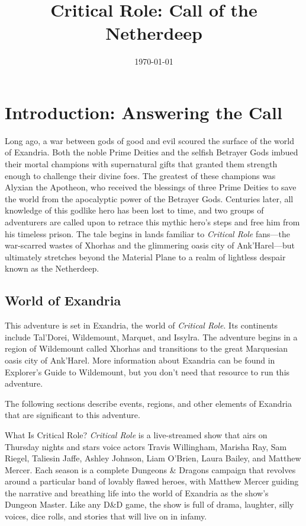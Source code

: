 \documentclass[a4paper, 11pt, bg=full, twocolumn, nooutline]{dndbook}
\title{Critical Role: Call of the Netherdeep}
\date{\today}
\begin{document}
\frontmatter

\maketitle
\thispagestyle{empty}
\clearpage

\tableofcontents
\clearpage

\mainmatter

\chapter{Introduction: Answering the Call}\label{ch:introduction-answering-the-call-1-1}

Long ago, a war between gods of good and evil scoured the surface of the world of Exandria. Both the noble Prime Deities and the selfish Betrayer Gods imbued their mortal champions with supernatural gifts that granted them strength enough to challenge their divine foes. The greatest of these champions was Alyxian the Apotheon, who received the blessings of three Prime Deities to save the world from the apocalyptic power of the Betrayer Gods.
Centuries later, all knowledge of this godlike hero has been lost to time, and two groups of adventurers are called upon to retrace this mythic hero's steps and free him from his timeless prison. The tale begins in lands familiar to \textit{Critical Role} fans---the war-scarred wastes of Xhorhas and the glimmering oasis city of Ank'Harel---but ultimately stretches beyond the Material Plane to a realm of lightless despair known as the Netherdeep.
\section{World of Exandria}

This adventure is set in Exandria, the world of \textit{Critical Role}. Its continents include Tal'Dorei, Wildemount, Marquet, and Issylra. The adventure begins in a region of Wildemount called Xhorhas and transitions to the great Marquesian oasis city of Ank'Harel. More information about Exandria can be found in Explorer's Guide to Wildemount, but you don't need that resource to run this adventure.

The following sections describe events, regions, and other elements of Exandria that are significant to this adventure.

\begin{DndSidebar}{What Is Critical Role?}
\textit{Critical Role} is a live-streamed show that airs on Thursday nights and stars voice actors Travis Willingham, Marisha Ray, Sam Riegel, Taliesin Jaffe, Ashley Johnson, Liam O'Brien, Laura Bailey, and Matthew Mercer. Each season is a complete Dungeons \& Dragons campaign that revolves around a particular band of lovably flawed heroes, with Matthew Mercer guiding the narrative and breathing life into the world of Exandria as the show's Dungeon Master. Like any D\&D game, the show is full of drama, laughter, silly voices, dice rolls, and stories that will live on in infamy.
\end{DndSidebar}
\end{document}
